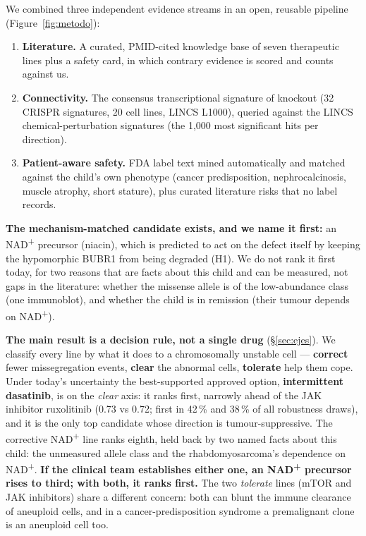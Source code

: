 \documentclass[10pt]{article}
\begin{document}
We combined three independent evidence streams in an open, reusable pipeline (Figure~\ref{fig:metodo}):
\begin{enumerate}
\item \textbf{Literature.} A curated, PMID-cited knowledge base of seven therapeutic lines plus a safety card, in which
  contrary evidence is scored and counts against us.
\item \textbf{Connectivity.} The consensus transcriptional signature of  knockout (32 CRISPR signatures,
  20 cell lines, LINCS L1000), queried against the LINCS chemical-perturbation signatures (the 1,000 most
  significant hits per direction).
\item \textbf{Patient-aware safety.} FDA label text mined automatically and matched against the child's own phenotype
  (cancer predisposition, nephrocalcinosis, muscle atrophy, short stature), plus curated literature risks that no
  label records.
\end{enumerate}

\textbf{The mechanism-matched candidate exists, and we name it first:} an NAD\textsuperscript{+} precursor
(niacin), which is predicted to act on the defect itself by keeping the hypomorphic BUBR1 from being degraded (H1). We do not rank
it first today, for two reasons that are facts about this child and can be measured, not gaps in the
literature: whether the missense allele is of the low-abundance class (one immunoblot), and whether the child is in
remission (their tumour depends on NAD\textsuperscript{+}).

\textbf{The main result is a decision rule, not a single drug} (§\ref{sec:ejes}). We classify every line by what it
does to a chromosomally unstable cell --- \textbf{correct} fewer missegregation events, \textbf{clear} the abnormal
cells, \textbf{tolerate} help them cope. Under today's uncertainty the best-supported approved option,
\textbf{intermittent dasatinib}, is on the \emph{clear} axis: it ranks first, narrowly ahead of the JAK inhibitor ruxolitinib (0.73 vs 0.72; first in 42\,\% and 38\,\% of all
robustness draws), and it is the only top candidate whose direction is tumour-suppressive. The corrective
NAD\textsuperscript{+} line ranks eighth, held back by two named facts about this child: the unmeasured allele
class and the rhabdomyosarcoma's dependence on NAD\textsuperscript{+}. \textbf{If the clinical team establishes
either one, an NAD\textsuperscript{+} precursor rises to third; with both, it ranks first.} The two
\emph{tolerate} lines (mTOR and JAK inhibitors) share a different concern: both can blunt the immune clearance of
aneuploid cells, and in a cancer-predisposition syndrome a premalignant clone is an aneuploid cell too.
\end{document}
